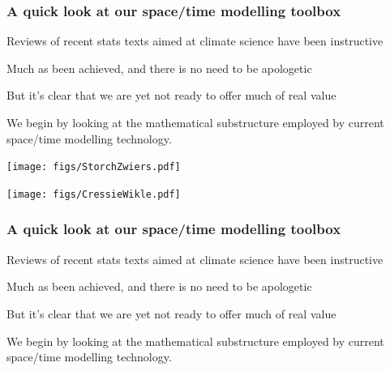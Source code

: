 \documentclass[11pt]{beamer}
\begin{document}

\begin{frame}

\frametitle{A quick look at our space/time modelling toolbox}

\bi
  \item Reviews of recent stats texts aimed at climate science have been instructive
  \item Much as been achieved, and there is no need to be apologetic
  \item But it's clear that we are yet not ready to offer much of real value
  \item We begin by looking at the mathematical substructure employed by current space/time modelling technology.
 \ei

\end{frame}


\begin{frame}

\begin{center}
\texttt{[image: figs/StorchZwiers.pdf]}
\end{center}

\end{frame}


\begin{frame}

\begin{center}
\texttt{[image: figs/CressieWikle.pdf]}
\end{center}

\end{frame}


\begin{frame}

\frametitle{A quick look at our space/time modelling toolbox}

\bi
  \item Reviews of recent stats texts aimed at climate science have been instructive
  \item Much as been achieved, and there is no need to be apologetic
  \item But it's clear that we are yet not ready to offer much of real value
  \item We begin by looking at the mathematical substructure employed by current space/time modelling technology.
 \ei

\end{frame}
\end{document}
